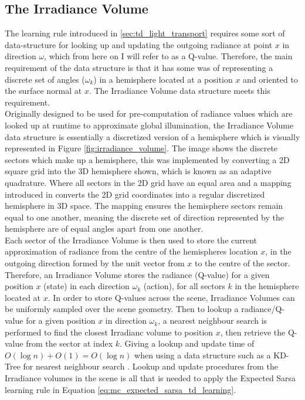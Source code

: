 \documentclass[ %
                    author={Callum Pearce},
                supervisor={Dr. Neill Campbell},
                    degree={MEng},
                     title={How effective are Temporal difference learning methods for reducing the number of zero contribution light paths while still accurately approximating Global Illumination in Path tracing?},
                  subtitle={},
                      type={research},
                      year={2019} ]{dissertation}
\begin{document}
\subsection{The Irradiance Volume}
The learning rule introduced in \ref{sec:td_light_transport} requires some sort of data-structure for looking up and updating the outgoing radiance at point $x$ in direction $\omega$, which from here on I will refer to as a Q-value. Therefore, the main requirement of the data structure is that it has some was of representing a discrete set of angles ($\omega_k$) in a hemisphere located at a position $x$ and oriented to the surface normal at $x$. The Irradiance Volume data structure \cite{greger1998irradiance} meets this requirement.\\


Originally designed to be used for pre-computation of radiance values which are looked up at runtime to approximate global illumination, the Irradiance Volume data structure is essentially a discretized version of a hemisphere which is visually represented in Figure \ref{fig:irradiance_volume}. The image shows the discrete sectors which make up a hemisphere, this was implemented by converting a 2D square grid into the 3D hemisphere shown, which is known as an adaptive quadrature. Where all sectors in the 2D grid have an equal area and a mapping introduced in \cite{shirley1994notes} converts the 2D grid coordinates into a regular discretized hemisphere in 3D space. The mapping ensures the hemisphere sectors remain equal to one another, meaning the discrete set of direction represented by the hemisphere are of equal angles apart from one another.\\


Each sector of the Irradiance Volume is then used to store the current approximation of radiance from the centre of the hemispheres location $x$, in the outgoing direction formed by the unit vector from $x$ to the centre of the sector. Therefore, an Irradiance Volume stores the radiance (Q-value) for a given position $x$ (state) in each direction $\omega_k$ (action), for all sectors $k$ in the hemisphere located at $x$. In order to store Q-values across the scene, Irradiance Volumes can be uniformly sampled over the scene geometry. Then to lookup a radiance/Q-value for a given position $x$ in direction $\omega_k$, a nearest neighbour search is performed to find the closest Irradianc volume to position $x$, then retrieve the Q-value from the sector at index $k$. Giving a lookup and update time of $O(\log n) + O(1) = O(\log n)$ when using a data structure such as a KD-Tree for nearest neighbour search \cite{bentley1975multidimensional}. Lookup and update procedures from the Irradiance volumes in the scene is all that is needed to apply the Expected Sarsa learning rule in Equation \ref{eq:mc_expected_sarsa_td_learning}.
\end{document}
